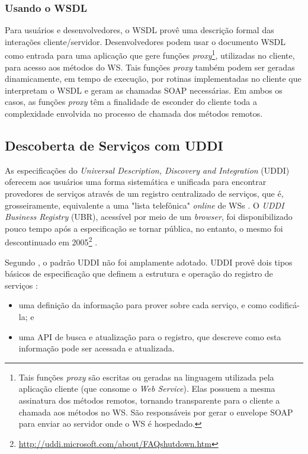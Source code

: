 \subsubsection{Usando o WSDL}

Para usuários e desenvolvedores, o WSDL provê uma descrição formal das interações cliente/servidor.
Desenvolvedores podem usar o documento WSDL como entrada para uma aplicação que gere 
funções \textit{proxy}\footnote{Tais funções \textit{proxy} são escritas ou geradas
na linguagem utilizada pela aplicação cliente (que consome o \textit{Web Service}). Elas possuem
a mesma assinatura dos métodos remotos, tornando transparente para o cliente a chamada
aos métodos no WS. São responsáveis por gerar o envelope SOAP para enviar ao
servidor onde o WS é hospedado.},
utilizadas no cliente, para acesso aos métodos do WS. Tais funções \textit{proxy}
também podem ser geradas dinamicamente, em tempo de execução, por rotinas implementadas
no cliente que interpretam o WSDL e geram as chamadas SOAP necessárias.
Em ambos os casos, as funções \textit{proxy} têm a finalidade de esconder do cliente toda a complexidade
envolvida no processo de chamada dos métodos remotos.

\subsection{Descoberta de Serviços com UDDI} \label{sec:uddi}

As especificações do \textit{Universal Description, Discovery and Integration} (UDDI) oferecem aos usuários uma forma sistemática e unificada para encontrar provedores
de serviços através de um registro centralizado de serviços, que é, grosseiramente,
equivalente a uma "lista telefônica" \textit{online} de WSs \cite{curbera2002unraveling}.
O \textit{UDDI Business Registry} (UBR), acessível por meio de um \textit{browser}, foi
disponibilizado pouco tempo após a especificação se tornar pública, no entanto, o mesmo foi descontinuado
em 2005\footnote{\url{http://uddi.microsoft.com/about/FAQshutdown.htm}} \cite{treiber2007active}.

Segundo \cite{sommerville2011soft}, o padrão UDDI não foi amplamente adotado.
UDDI provê dois tipos básicos de especificação que definem a estrutura
e operação do registro de serviços \cite{curbera2002unraveling}:

\begin{itemize}
	\item uma definição da informação para prover sobre cada serviço, e como codificá-la; e
  \item uma API de busca e atualização para o registro, que descreve como esta informação
  pode ser acessada e atualizada.
\end{itemize}

